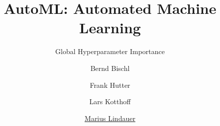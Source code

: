 




\title[AutoML: Overview]{AutoML: Automated Machine Learning}
\subtitle{Global Hyperparameter Importance}
\author[Marius Lindauer]{Bernd Bischl \and Frank Hutter \and Lars Kotthoff \and \underline{Marius Lindauer}}
\institute{}
\date{}





	
	\maketitle
	

